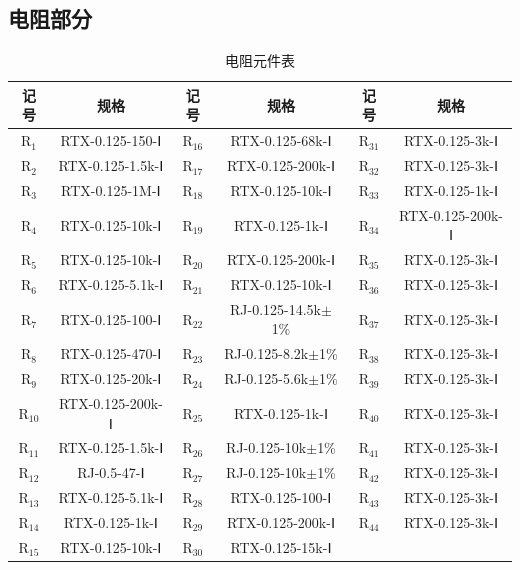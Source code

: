\documentclass[12pt,UTF8]{ctexbook}
\begin{document}
	\subsection{电阻部分}
	\begin{table}[H]
		\centering
		\small
		\setlength{\tabcolsep}{4pt}
		\caption{电阻元件表}
		\begin{tabular}{|c|c||c|c||c|c|}
			\hline
			\textbf{记号} & \textbf{规格} & \textbf{记号} & \textbf{规格} & \textbf{记号} & \textbf{规格} \\ \hline
			R\(_1\) & RTX-0.125-150-Ⅰ & R\(_{16}\) & RTX-0.125-68k-Ⅰ & R\(_{31}\) & RTX-0.125-3k-Ⅰ \\ \hline
			R\(_2\) & RTX-0.125-1.5k-Ⅰ & R\(_{17}\) & RTX-0.125-200k-Ⅰ & R\(_{32}\) & RTX-0.125-3k-Ⅰ \\ \hline
			R\(_3\) & RTX-0.125-1M-Ⅰ & R\(_{18}\) & RTX-0.125-10k-Ⅰ & R\(_{33}\) & RTX-0.125-1k-Ⅰ \\ \hline
			R\(_4\) & RTX-0.125-10k-Ⅰ & R\(_{19}\) & RTX-0.125-1k-Ⅰ & R\(_{34}\) & RTX-0.125-200k-Ⅰ \\ \hline
			R\(_5\) & RTX-0.125-10k-Ⅰ & R\(_{20}\) & RTX-0.125-200k-Ⅰ & R\(_{35}\) & RTX-0.125-3k-Ⅰ \\ \hline
			R\(_6\) & RTX-0.125-5.1k-Ⅰ & R\(_{21}\) & RTX-0.125-10k-Ⅰ & R\(_{36}\) & RTX-0.125-3k-Ⅰ \\ \hline
			R\(_7\) & RTX-0.125-100-Ⅰ & R\(_{22}\) & RJ-0.125-14.5k\(\pm\)1\% & R\(_{37}\) & RTX-0.125-3k-Ⅰ \\ \hline
			R\(_8\) & RTX-0.125-470-Ⅰ & R\(_{23}\) & RJ-0.125-8.2k\(\pm\)1\% & R\(_{38}\) & RTX-0.125-3k-Ⅰ \\ \hline
			R\(_9\) & RTX-0.125-20k-Ⅰ & R\(_{24}\) & RJ-0.125-5.6k\(\pm\)1\% & R\(_{39}\) & RTX-0.125-3k-Ⅰ \\ \hline
			R\(_{10}\) & RTX-0.125-200k-Ⅰ & R\(_{25}\) & RTX-0.125-1k-Ⅰ & R\(_{40}\) & RTX-0.125-3k-Ⅰ \\ \hline
			R\(_{11}\) & RTX-0.125-1.5k-Ⅰ & R\(_{26}\) & RJ-0.125-10k\(\pm\)1\% & R\(_{41}\) & RTX-0.125-3k-Ⅰ \\ \hline
			R\(_{12}\) & RJ-0.5-47-Ⅰ & R\(_{27}\) & RJ-0.125-10k\(\pm\)1\% & R\(_{42}\) & RTX-0.125-3k-Ⅰ \\ \hline
			R\(_{13}\) & RTX-0.125-5.1k-Ⅰ & R\(_{28}\) & RTX-0.125-100-Ⅰ & R\(_{43}\) & RTX-0.125-3k-Ⅰ \\ \hline
			R\(_{14}\) & RTX-0.125-1k-Ⅰ & R\(_{29}\) & RTX-0.125-200k-Ⅰ & R\(_{44}\) & RTX-0.125-3k-Ⅰ \\ \hline
			R\(_{15}\) & RTX-0.125-10k-Ⅰ & R\(_{30}\) & RTX-0.125-15k-Ⅰ & & \\ \hline
		\end{tabular}
	\end{table}
	
\end{document}
